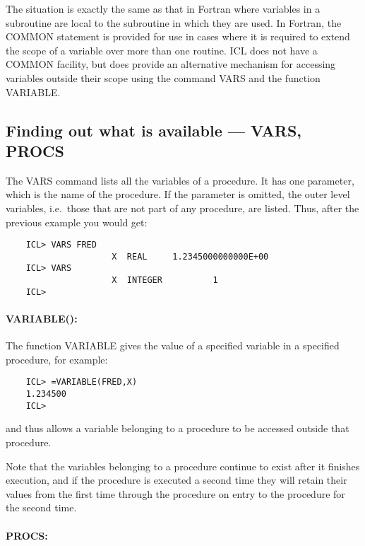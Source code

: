 The situation is exactly the same as that in Fortran where variables in a
subroutine are local to the subroutine in which they are used.
In Fortran, the COMMON statement is provided for use in cases where it is
required to extend the scope of a variable over more than one routine.
ICL does not have a COMMON facility, but does provide an alternative mechanism
for accessing variables outside their scope using the command VARS and the
function VARIABLE.

\subsection{Finding out what is available --- VARS, PROCS}

The VARS command lists all the variables of a procedure.
It has one parameter, which is the name of the procedure.
If the parameter is omitted, the outer level variables, i.e.\ those that are
not part of any procedure, are listed.
Thus, after the previous example you would get:

\begin{small}
\begin{verbatim}
    ICL> VARS FRED
                     X  REAL     1.2345000000000E+00
    ICL> VARS       
                     X  INTEGER          1
    ICL>
\end{verbatim}
\end{small}

\paragraph{VARIABLE():}\hfill

The function VARIABLE gives the value of a specified variable in a specified
procedure, for example:

\begin{small}
\begin{verbatim}
    ICL> =VARIABLE(FRED,X)
    1.234500
    ICL>
\end{verbatim}
\end{small}

and thus allows a variable belonging to a procedure to be accessed outside
that procedure.

Note that the variables belonging to a procedure continue to exist after it
finishes execution, and if the procedure is executed a second time they will
retain their values from the first time through the procedure on entry to the
procedure for the second time.

\paragraph{PROCS:}\hfill

